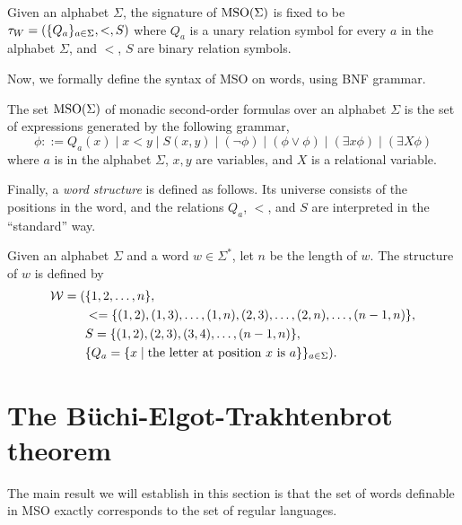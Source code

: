 \documentclass[11pt,twoside=off,numbers=noenddot]{scrbook}
\begin{document}
\begin{definition}
  Given an alphabet $\Sigma$, the signature of $\text{MSO}(\Sigma)$ is fixed to be $\tau_W = (\{ Q_a \}_{a \in \Sigma}, <, S)$ where $Q_a$ is a unary relation symbol for every $a$ in the alphabet $\Sigma$, and $<$, $S$ are binary relation symbols.
\end{definition}

Now, we formally define the syntax of MSO on words, using BNF grammar.

\begin{definition}
  The set $\text{MSO}(\Sigma)$ of monadic second-order formulas over an alphabet $\Sigma$ is the set of expressions generated by the following grammar,
  \[ \phi ::= Q_a(x) \mid x < y \mid S(x, y) \mid (\neg \phi) \mid (\phi \vee \phi) \mid (\exists x \phi) \mid (\exists X \phi) \]
  where $a$ is in the alphabet $\Sigma$, $x, y$ are variables, and $X$ is a relational variable.
\end{definition}

Finally, a \emph{word structure} is defined as follows. Its universe consists of the positions in the word, and the relations $Q_a$, $<$, and $S$ are interpreted in the ``standard'' way.

\begin{definition}
  Given an alphabet $\Sigma$ and a word $w \in \Sigma^\ast$, let $n$ be the length of $w$. The structure of $w$ is defined by
  \begin{align*}
    \mathcal{W} = ( & \{ 1, 2, \dots, n \}, \\
      & < = \{ (1, 2), (1, 3), \dots, (1, n), (2, 3), \dots, (2, n), \dots, (n - 1, n) \}, \\
      & S = \{ (1, 2), (2, 3), (3, 4), \dots, (n - 1, n) \}, \\
    & \{ Q_a = \{ x \mid \text{the letter at position $x$ is $a$} \} \}_{a \in \Sigma}).
  \end{align*}
\end{definition}


\section{The Büchi-Elgot-Trakhtenbrot theorem}
The main result we will establish in this section is that the set of words definable in MSO exactly corresponds to the set of regular languages.
\end{document}
